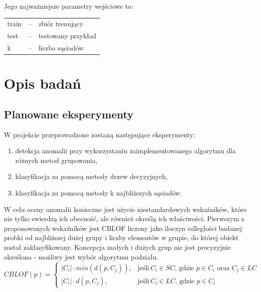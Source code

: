 \documentclass[11pt,a4paper,twoside]{article}
\begin{document}
Jego najważniejsze parametry wejściowe to:

\begin{table}[ht]
\label{kNN_params}
\centering
\begin{tabularx}{\textwidth}{lcX}
train & -- & zbiór trenujący \\
test & -- & testowany przykład \\
k & -- & liczba sąsiadów \\
\end{tabularx}
\end{table}


\section{Opis badań}
\subsection{Planowane eksperymenty}

W projekcie przeprowadzone zostaną następujące eksperymenty:

\begin{enumerate}
  \item detekcja anomalii przy wykorzystaniu zaimplementowanego algorytmu dla różnych metod grupowania,
  \item klasyfikacja za pomocą metody drzew decyzyjnych,
  \item klasyfikacja za pomocą metody k najbliższych sąsiadów.
\end{enumerate}


W celu oceny anomalii konieczne jest użycie niestandardowych wskaźników, które nie tylko swierdzą ich obecność, ale również określą ich właściwości. Pierwszym z proponowanych wskaźników jest CBLOF liczony jako iloczyn odległości badanej probki od najbliższej dużej grupy i liczby elementów w grupie, do której obiekt został zaklasyfikowany. Koncepcja małych i dużych grup nie jest precyzyjnie określona - możliwy jest wybór algorytmu podziału.
\begin{equation}
CBLOF(p) = \begin{cases}
   |C_{i}| \cdot min(d(p,C_{j})), & \text{jeśli}\ C_{i} \in SC \text{, gdzie } p \in C_{i} \text{ oraz } C_{j} \in LC\\
    |C_{i}| \cdot d(p,C_{j}), & \text{jeśli}\ C_{i} \in LC \text{, gdzie } p \in C_{i}
  \end{cases}
\end{equation}
\end{document}
